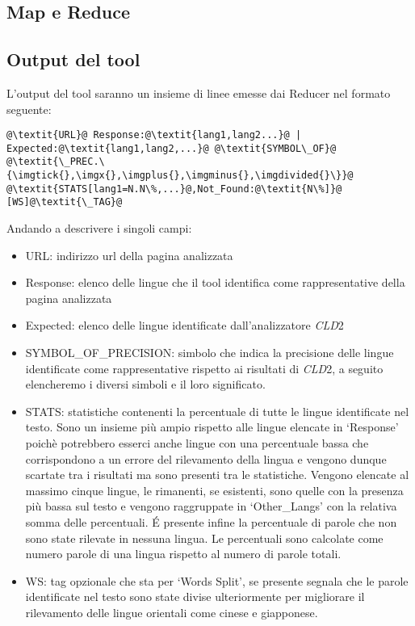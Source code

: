 \documentclass{article}
\newcommand{\cld}{\textit{CLD}2}
\begin{document}
\subsection{Map e Reduce}

\subsection{Output del tool}
L'output del tool saranno un insieme di linee emesse dai Reducer nel formato seguente:
\begin{verbatim}
@\textit{URL}@ Response:@\textit{lang1,lang2...}@ | Expected:@\textit{lang1,lang2,...}@ @\textit{SYMBOL\_OF}@
@\textit{\_PREC.\{\imgtick{},\imgx{},\imgplus{},\imgminus{},\imgdivided{}\}}@ @\textit{STATS[lang1=N.N\%,...}@,Not_Found:@\textit{N\%]}@ [WS]@\textit{\_TAG}@
\end{verbatim}

Andando a descrivere i singoli campi:
\begin{itemize}
    \item URL: indirizzo url della pagina analizzata
    \item Response: elenco delle lingue che il tool identifica come rappresentative della pagina analizzata
    \item Expected: elenco delle lingue identificate dall'analizzatore \cld{}
    \item SYMBOL\_OF\_PRECISION: simbolo che indica la precisione delle lingue identificate come rappresentative rispetto ai risultati di \cld{}, a seguito elencheremo i diversi simboli e il loro significato.
    \item STATS: statistiche contenenti la percentuale di tutte le lingue identificate nel testo. Sono un insieme più ampio rispetto alle lingue elencate in `Response' poichè potrebbero esserci anche lingue con una percentuale bassa che corrispondono a un errore del rilevamento della lingua e vengono dunque scartate tra i risultati ma sono presenti tra le statistiche. Vengono elencate al massimo cinque lingue, le rimanenti, se esistenti, sono quelle con la presenza più bassa sul testo e vengono raggruppate in `Other\_Langs' con la relativa somma delle percentuali. \'E presente infine la percentuale di parole che non sono state rilevate in nessuna lingua. Le percentuali sono calcolate come numero parole di una lingua rispetto al numero di parole totali. 
    \item WS: tag opzionale che sta per `Words Split', se presente segnala che le parole identificate nel testo sono state divise ulteriormente per migliorare il rilevamento delle lingue orientali come cinese e giapponese.
\end{itemize}
\end{document}
